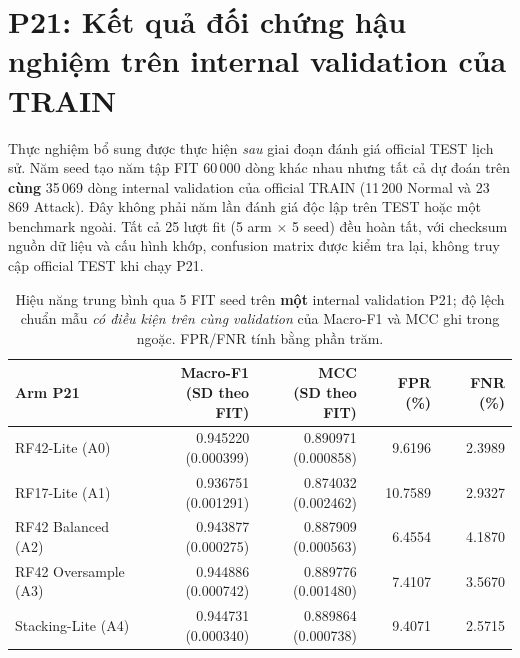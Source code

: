 \section{P21: Kết quả đối chứng hậu nghiệm trên internal validation của TRAIN}
\label{sec:p21-results}
Thực nghiệm bổ sung được thực hiện \emph{sau} giai đoạn đánh giá official TEST lịch sử. Năm seed tạo năm tập FIT 60\,000 dòng khác nhau nhưng tất cả dự đoán trên \textbf{cùng} 35\,069 dòng internal validation của official TRAIN (11\,200 Normal và 23\,869 Attack). Đây không phải năm lần đánh giá độc lập trên TEST hoặc một benchmark ngoài. Tất cả 25 lượt fit (5 arm $\times$ 5 seed) đều hoàn tất, với checksum nguồn dữ liệu và cấu hình khớp, confusion matrix được kiểm tra lại, không truy cập official TEST khi chạy P21.

\begin{table}[htbp]\centering
\small
\renewcommand{\arraystretch}{1.26}
\setlength{\tabcolsep}{3pt}
\caption{Hiệu năng trung bình qua 5 FIT seed trên \textbf{một} internal validation P21; độ lệch chuẩn mẫu \emph{có điều kiện trên cùng validation} của Macro-F1 và MCC ghi trong ngoặc. FPR/FNR tính bằng phần trăm.}
\label{tab:p21-five-arm-results}
\begin{tabular}{lrrrr}
\toprule
Arm P21 & \shortstack{Macro-F1\\(SD theo FIT)} & \shortstack{MCC\\(SD theo FIT)} & FPR (\%) & FNR (\%)\\\midrule
RF42-Lite (A0) & \shortstack{0.945220\\{\scriptsize (0.000399)}} & \shortstack{0.890971\\{\scriptsize (0.000858)}} & 9.6196 & 2.3989\\
RF17-Lite (A1) & \shortstack{0.936751\\{\scriptsize (0.001291)}} & \shortstack{0.874032\\{\scriptsize (0.002462)}} & 10.7589 & 2.9327\\
RF42 Balanced (A2) & \shortstack{0.943877\\{\scriptsize (0.000275)}} & \shortstack{0.887909\\{\scriptsize (0.000563)}} & 6.4554 & 4.1870\\
RF42 Oversample (A3) & \shortstack{0.944886\\{\scriptsize (0.000742)}} & \shortstack{0.889776\\{\scriptsize (0.001480)}} & 7.4107 & 3.5670\\
Stacking-Lite (A4) & \shortstack{0.944731\\{\scriptsize (0.000340)}} & \shortstack{0.889864\\{\scriptsize (0.000738)}} & 9.4071 & 2.5715\\\bottomrule
\end{tabular}
\vspace{3pt}


\end{table}
